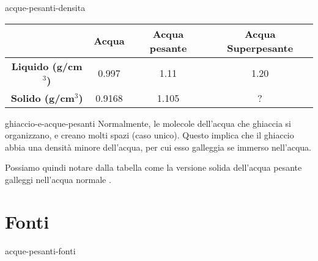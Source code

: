 \documentclass[preview]{standalone}
\begin{document}
\begin{snippet}{acque-pesanti-densita}
    \begin{center}
        \bgroup{}
        \def\arraystretch{1.25}
        \begin{tabular}{ |c|c|c|c| }
            \hline
            & \textbf{Acqua} & \textbf{Acqua pesante} & \textbf{Acqua Superpesante} \\
            \hline
            \textbf{Liquido (g/cm\(^3\))} & 0.997 & 1.11 & 1.20 \\
            \hline
            \textbf{Solido (g/cm\(^3\))} & 0.9168 & 1.105 & ? \\
            \hline
        \end{tabular}
        \egroup{}
    \end{center}
    \phantom{ }
    \end{snippet}

    \begin{snippet}{ghiaccio-e-acque-pesanti}
    Normalmente, le molecole dell'acqua che ghiaccia si organizzano, e creano molti spazi (caso unico).
    Questo implica che il ghiaccio abbia una densità minore dell'acqua, per cui esso galleggia se immerso nell'acqua.

    Possiamo quindi notare dalla tabella come la versione solida dell'acqua pesante galleggi
    nell'acqua normale \cite{deuterated-water}.
\end{snippet}

\section{Fonti}

\nocite{*} %

\begin{snippet}{acque-pesanti-fonti}
    \printbibliography[heading=none]
\end{snippet}
\end{document}
